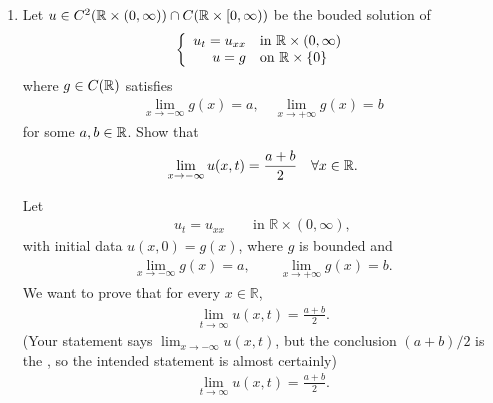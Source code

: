 \documentclass[12pt,a4paper]{report}
\begin{document}
\begin{enumerate}
\textbf{Questions:}


\newpage
\item Let $u \in C^2(\mathbb{R}\times(0,\infty))\cap C(\mathbb{R}\times[0,\infty))$ be the bouded solution of
\begin{align*}
	\left \{\begin{array}{rl}
		 u_t=u_{xx} & \text{in } \mathbb{R}\times(0,\infty)\\
		u = g & \text{on } \mathbb{R}\times\{0\}
	\end{array} \right .
\end{align*}
where $g \in C(\mathbb{R})$ satisfies
\begin{align*}
	\lim_{x\to -\infty} g(x) = a, \quad \lim_{x\to +\infty} g(x) = b
\end{align*}
for some $a,b\in \mathbb{R}$.  Show that
\begin{align*}
	\lim_{x\to -\infty} u(x,t)=\frac{a+b}{2}\quad\forall x \in \mathbb{R}.
\end{align*}

\HLINE

Let
\begin{align*}
u_t=u_{xx}\qquad\text{in }\mathbb R\times (0,\infty),
\end{align*}
with initial data $u(x,0)=g(x)$, where $g$ is bounded and
\begin{align*}
\lim_{x\to -\infty}g(x)=a, \qquad \lim_{x\to +\infty}g(x)=b.
\end{align*}
We want to prove that for every $x\in\mathbb R$,
\begin{align*}
\lim_{t\to\infty}u(x,t)=\frac{a+b}{2}.
\end{align*}
(Your statement says $\lim_{x\to-\infty}u(x,t)$, but the conclusion $(a+b)/2$ is the , so the intended statement is almost certainly)
\begin{align*}
\boxed{\lim_{t\to\infty}u(x,t)=\frac{a+b}{2}}.
\end{align*}
\end{enumerate}
\end{document}
